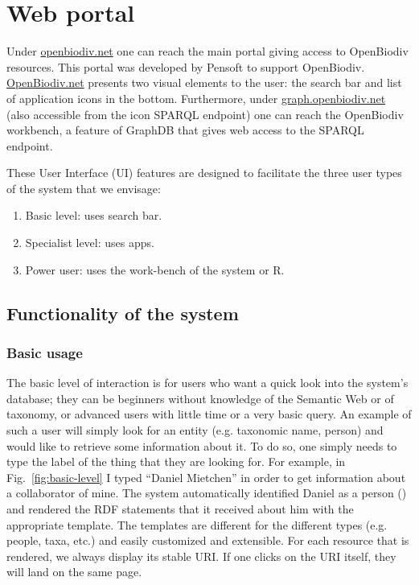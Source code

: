 
\chapter{Web portal} %
\label{chapter-webportal}


Under \href{http://openbiodiv.net}{openbiodiv.net} one can reach the main portal giving access to OpenBiodiv resources. This portal was developed by Pensoft to support OpenBiodiv. \href{http://openbiodiv.net}{OpenBiodiv.net} presents two visual elements to the user: the search bar and list of application icons in the bottom. Furthermore, under \href{http://graph.openbiodiv.net}{graph.openbiodiv.net} (also accessible from the icon SPARQL endpoint) one can reach the OpenBiodiv workbench, a feature of GraphDB that gives web access to the SPARQL endpoint.

These User Interface (UI) features are designed to facilitate the three user types of the system that we envisage:

\begin{enumerate}
    \item Basic level: uses search bar.
    \item Specialist level: uses apps.
    \item Power user: uses the work-bench of the system or R.
\end{enumerate}

\section{Functionality of the system}

\subsection{Basic usage}

The basic level of interaction is for users who want a quick look into the system's database; they can be beginners without knowledge of the Semantic Web or of taxonomy, or advanced users with little time or a very basic query. An example of such a user will simply look for an entity (e.g. taxonomic name, person) and would like to retrieve some information about it. To do so, one simply needs to type the label of the thing that they are looking for. For example, in Fig.~\ref{fig:basic-level} I typed ``Daniel Mietchen'' in order to get information about a collaborator of mine. The system automatically identified Daniel as a person () and rendered the RDF statements that it received about him with the appropriate template. The templates are different for the different types (e.g. people, taxa, etc.) and easily customized and extensible. For each resource that is rendered, we always display its stable URI. If one clicks on the URI itself, they will land on the same page.

